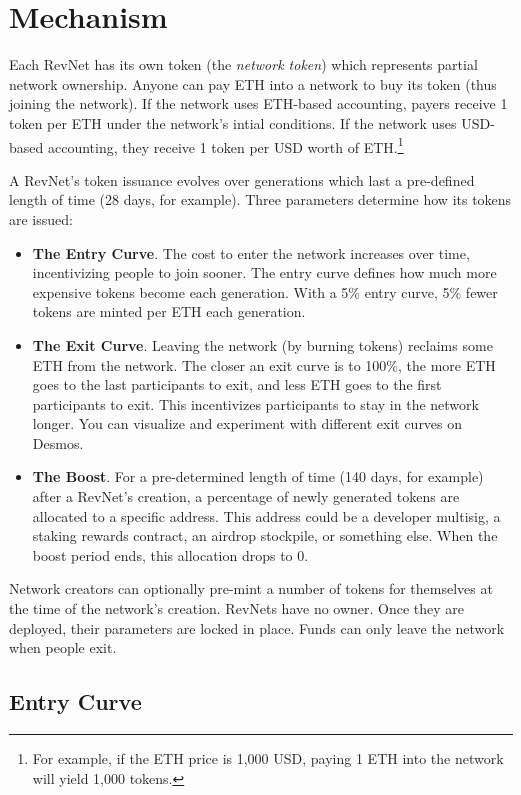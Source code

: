 \documentclass{article}
\begin{document}
\section{Mechanism}

Each RevNet has its own token (the \textit{network token}) which represents partial network ownership. Anyone can pay ETH into a network to buy its token (thus joining the network). If the network uses ETH-based accounting, payers receive 1 token per ETH under the network's intial conditions. If the network uses USD-based accounting, they receive 1 token per USD worth of ETH.\footnote{For example, if the ETH price is 1,000 USD, paying 1 ETH into the network will yield 1,000 tokens.}

A RevNet's token issuance evolves over generations which last a pre-defined length of time (28 days, for example). Three parameters determine how its tokens are issued:

\begin{itemize}
  \item \textbf{The Entry Curve}. The cost to enter the network increases over time, incentivizing people to join sooner. The entry curve defines how much more expensive tokens become each generation. With a 5\% entry curve, 5\% fewer tokens are minted per ETH each generation.
  \item \textbf{The Exit Curve}. Leaving the network (by burning tokens) reclaims some ETH from the network. The closer an exit curve is to 100\%, the more ETH goes to the last participants to exit, and less ETH goes to the first participants to exit. This incentivizes participants to stay in the network longer. You can visualize and experiment with different exit curves on Desmos.
  \item \textbf{The Boost}. For a pre-determined length of time (140 days, for example) after a RevNet's creation, a percentage of newly generated tokens are allocated to a specific address. This address could be a developer multisig, a staking rewards contract, an airdrop stockpile, or something else. When the boost period ends, this allocation drops to 0.
\end{itemize}

Network creators can optionally pre-mint a number of tokens for themselves at the time of the network's creation. RevNets have no owner. Once they are deployed, their parameters are locked in place. Funds can only leave the network when people exit.

\subsection{Entry Curve}
\end{document}
